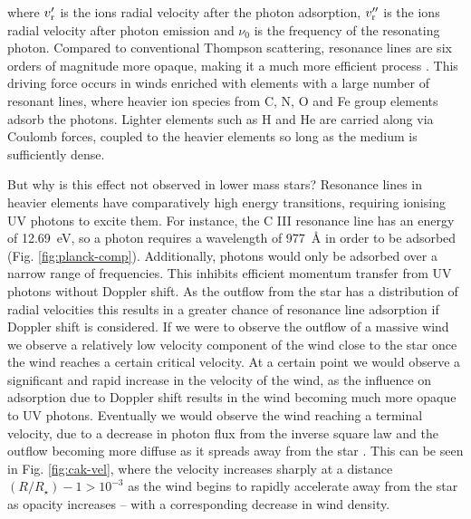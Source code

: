 \noindent
where $v_\text{r}'$ is the ions radial velocity after the photon adsorption, $v_\text{r}''$ is the ions radial velocity after photon emission and $\nu_0$ is the frequency of the resonating photon.
Compared to conventional Thompson scattering, resonance lines are six orders of magnitude more opaque, making it a much more efficient process
\parencite[Ch.~8]{lamersIntroductionStellarWinds1999}.
This driving force occurs in winds enriched with elements with a large number of resonant lines, where heavier ion species from C, N, O and Fe group elements adsorb the photons.
Lighter elements such as H and He are carried along via Coulomb forces, coupled to the heavier elements so long as the medium is sufficiently dense.

But why is this effect not observed in lower mass stars?
Resonance lines in heavier elements have comparatively high energy transitions, requiring ionising UV photons to excite them. 
For instance, the C III resonance line has an energy of \SI{12.69}{\electronvolt}, so a photon requires a wavelength of \SI{977}{\angstrom} in order to be adsorbed (Fig. {\ref{fig:planck-comp}}).
Additionally, photons would only be adsorbed over a narrow range of frequencies.
This inhibits efficient momentum transfer from UV photons without Doppler shift.
As the outflow from the star has a distribution of radial velocities this results in a greater chance of resonance line adsorption if Doppler shift is considered.
If we were to observe the outflow of a massive wind we observe a relatively low velocity component of the wind close to the star once the wind reaches a certain critical velocity.
At a certain point we would observe a significant and rapid increase in the velocity of the wind, as the influence on adsorption due to Doppler shift results in the wind becoming much more opaque to UV photons.
Eventually we would observe the wind reaching a terminal velocity, due to a decrease in photon flux from the inverse square law and the outflow becoming more diffuse as it spreads away from the star \parencite[Ch.~10]{macielHydrodynamicsStellarWinds2014}.
This can be seen in Fig. \ref{fig:cak-vel}, where the velocity increases sharply at a distance $(R/R_\star) - 1 > 10^{-3}$ as the wind begins to rapidly accelerate away from the star as opacity increases -- with a corresponding decrease in wind density.

